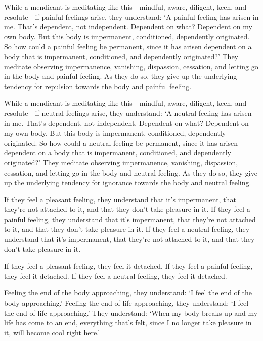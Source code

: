 \documentclass[12pt,openany]{book}%
\begin{document}
While a mendicant is meditating like this—mindful, aware, diligent, keen, and resolute—if painful feelings arise, they understand: ‘A painful feeling has arisen in me. That’s dependent, not independent. Dependent on what? Dependent on my own body. But this body is impermanent, conditioned, dependently originated. So how could a painful feeling be permanent, since it has arisen dependent on a body that is impermanent, conditioned, and dependently originated?’ They meditate observing impermanence, vanishing, dispassion, cessation, and letting go in the body and painful feeling. As they do so, they give up the underlying tendency for repulsion towards the body and painful feeling. 

While a mendicant is meditating like this—mindful, aware, diligent, keen, and resolute—if neutral feelings arise, they understand: ‘A neutral feeling has arisen in me. That’s dependent, not independent. Dependent on what? Dependent on my own body. But this body is impermanent, conditioned, dependently originated. So how could a neutral feeling be permanent, since it has arisen dependent on a body that is impermanent, conditioned, and dependently originated?’ They meditate observing impermanence, vanishing, dispassion, cessation, and letting go in the body and neutral feeling. As they do so, they give up the underlying tendency for ignorance towards the body and neutral feeling. 

If they feel a pleasant feeling, they understand that it’s impermanent, that they’re not attached to it, and that they don’t take pleasure in it. If they feel a painful feeling, they understand that it’s impermanent, that they’re not attached to it, and that they don’t take pleasure in it. If they feel a neutral feeling, they understand that it’s impermanent, that they’re not attached to it, and that they don’t take pleasure in it. 

If they feel a pleasant feeling, they feel it detached. If they feel a painful feeling, they feel it detached. If they feel a neutral feeling, they feel it detached. 

Feeling the end of the body approaching, they understand: ‘I feel the end of the body approaching.’ Feeling the end of life approaching, they understand: ‘I feel the end of life approaching.’ They understand: ‘When my body breaks up and my life has come to an end, everything that’s felt, since I no longer take pleasure in it, will become cool right here.’ 
\end{document}
